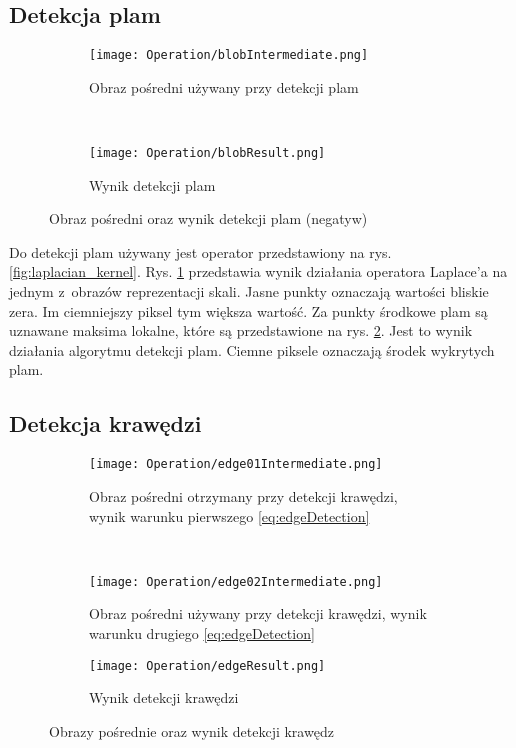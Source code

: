 \subsection{Detekcja plam}
\label{sec:dzialanieBlob}

\begin{figure}[h]
\begin{center}

\begin{subfigure}[t]{0.3\textwidth}
\texttt{[image: Operation/blobIntermediate.png]}
\caption{Obraz pośredni używany przy detekcji plam}
\label{fig:blobIntermediate}
\end{subfigure}
~
\begin{subfigure}[t]{0.3\textwidth}
\texttt{[image: Operation/blobResult.png]}
\caption{Wynik detekcji plam}
\label{fig:blobResult}
\end{subfigure}

\end{center}
\label{fig:showBlob}
\caption{Obraz pośredni oraz wynik detekcji plam (negatyw)}
\end{figure}

Do detekcji plam używany jest operator przedstawiony na rys. \ref{fig:laplacian_kernel}. Rys. \ref{fig:blobIntermediate} przedstawia wynik działania operatora Laplace'a na jednym z~obrazów reprezentacji skali. Jasne punkty oznaczają wartości bliskie zera. Im ciemniejszy piksel tym większa wartość. Za punkty środkowe plam są uznawane maksima lokalne, które są przedstawione na rys. \ref{fig:blobResult}. Jest to wynik działania algorytmu detekcji plam. Ciemne piksele oznaczają środek wykrytych plam.

\subsection{Detekcja krawędzi}
\label{sec:dzialanieEdge}

\begin{figure}[h]
\begin{center}

\begin{subfigure}[t]{0.3\textwidth}
\texttt{[image: Operation/edge01Intermediate.png]}
\caption{Obraz pośredni otrzymany przy detekcji krawędzi, wynik warunku pierwszego \eqref{eq:edgeDetection}}
\label{fig:edgeIntermediate1}
\end{subfigure}
~
\begin{subfigure}[t]{0.3\textwidth}
\texttt{[image: Operation/edge02Intermediate.png]}
\caption{Obraz pośredni używany przy detekcji krawędzi, wynik warunku drugiego \eqref{eq:edgeDetection}}
\label{fig:edgeIntermediate2}
\end{subfigure}

\begin{subfigure}[t]{0.3\textwidth}
\texttt{[image: Operation/edgeResult.png]}
\caption{Wynik detekcji krawędzi}
\label{fig:edgeResult}
\end{subfigure}

\end{center}
\label{fig:showEdge}
\caption{Obrazy pośrednie oraz wynik detekcji krawędz}
\end{figure}

